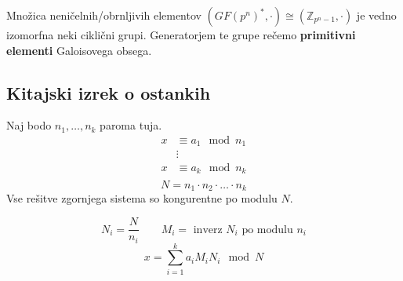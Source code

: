 \begin{multicols}{5}
Množica neničelnih/obrnljivih elementov $(GF(p^n)^*, \cdot) \cong (\mathbb{Z}_{p^n-1}, \cdot)$ je vedno izomorfna neki ciklični grupi.
Generatorjem te grupe rečemo \textbf{primitivni elementi} Galoisovega obsega.

\subsection*{Kitajski izrek o ostankih}
Naj bodo $n_1, \dots, n_k$ paroma tuja.
\begin{align*}
	x &\equiv a_1 \mod n_1 \\
	 & \vdots \\
	x &\equiv a_k \mod n_k \\
\end{align*}
\[ N = n_1 \cdot n_2 \cdot \dots \cdot n_k \]
Vse rešitve zgornjega sistema so kongurentne po modulu $N$.

\[ N_i = \frac{N}{n_i} \qquad M_i = \text{ inverz } N_i \text{ po modulu } n_i\]
\[x = \sum_{i=1}^{k} a_i M_i N_i \mod N\]

\end{multicols}
